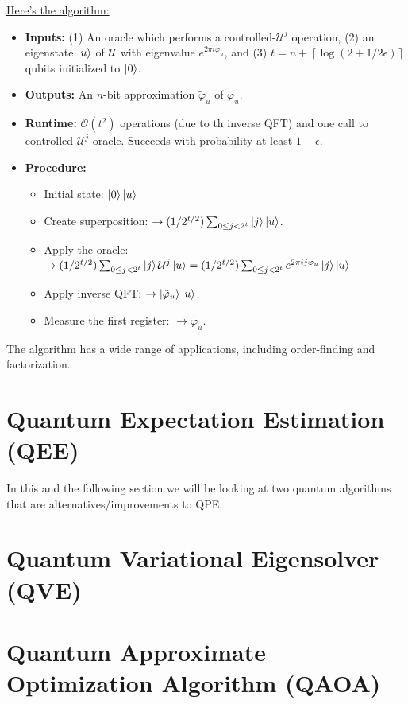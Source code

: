 \documentclass{book}
\theoremstyle{definition}
\newcommand{\lp}{\left(}
\newcommand{\rp}{\right)}
\newcommand{\U}{\mathcal{U}}
\begin{document}
\underline{Here's the algorithm:}
\begin{itemize}
	\item \textbf{Inputs:} (1) An oracle which performs a controlled-$\U^j$ operation, (2) an eigenstate $\ket{u}$ of $\U$ with eigenvalue $e^{2\pi i \varphi_u}$, and (3) $t = n + \left\lceil \log \lp 2 + 1/2\epsilon \rp \right \rceil$ qubits initialized to $\ket{0}$.
	
	
	\item \textbf{Outputs:} An $n$-bit approximation $\tilde\varphi_u$ of $\varphi_u$. 
	
	\item \textbf{Runtime:} $\mathcal{O}(t^2)$ operations (due to th inverse QFT) and one call to controlled-$\U^j$ oracle. Succeeds with probability at least $1-\epsilon$. 
	
	\item \textbf{Procedure:} 
	\begin{itemize}
		\item  Initial state: $\ket{0}\ket{u}$
		
		\item Create superposition: $\to (1/2^{t/2})\sum_{0 \leq j < 2^t}\ket{j}\ket{u}$.
		
		
		\item Apply the oracle:\\ $\to(1/2^{t/2})\sum_{0 \leq j < 2^t}\ket{j}\U^j\ket{u} = (1/2^{t/2})\sum_{0 \leq j < 2^t}e^{2\pi i j\varphi_u}\ket{j}\ket{u}$
		
		
		\item Apply inverse QFT: $\to \ket{\tilde\varphi_u}\ket{u}$. 
		
		\item Measure the first register: $\to \tilde \varphi_u$.
	\end{itemize}
\end{itemize}


The algorithm has a wide range of applications, including order-finding and factorization. 










\newpage



\section{Quantum Expectation Estimation (QEE)}


In this and the following section we will be looking at two quantum algorithms that are alternatives/improvements to QPE. 


\newpage


\section{Quantum Variational Eigensolver (QVE)}


\newpage


\section{Quantum Approximate Optimization Algorithm (QAOA)}

\newpage
\end{document}

